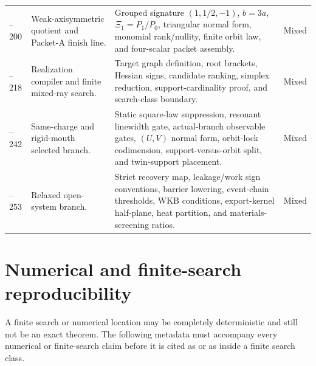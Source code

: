 \begin{longtable}{@{}L{0.13\textwidth}L{0.27\textwidth}L{0.42\textwidth}L{0.10\textwidth}@{}}
--200 & Weak-axisymmetric quotient and Packet-A finish line. & Grouped signature \((1,1/2,-1)\), \(b=3a\), \(\Xi_1=P_1/P_0\), triangular normal form, monomial rank/nullity, finite orbit law, and four-scalar packet assembly. & Mixed \\
--218 & Realization compiler and finite mixed-ray search. & Target graph definition, root brackets, Hessian signs, candidate ranking, simplex reduction, support-cardinality proof, and search-class boundary. & Mixed \\
--242 & Same-charge and rigid-mouth selected branch. & Static square-law suppression, resonant linewidth gate, actual-branch observable gates, \((U,V)\) normal form, orbit-lock codimension, support-versus-orbit split, and twin-support placement. & Mixed \\
--253 & Relaxed open-system branch. & Strict recovery map, leakage/work sign conventions, barrier lowering, event-chain thresholds, WKB conditions, export-kernel half-plane, heat partition, and materials-screening ratios. & Mixed \\
\bottomrule
\end{longtable}

\section{Numerical and finite-search reproducibility}
\label{sec:numerical-finite-search-reproducibility}

A finite search or numerical location may be completely deterministic and still not be an exact theorem.  The following metadata must accompany every numerical or finite-search claim before it is cited as \StatusNumerical{} or as \StatusExactClosure{} inside a finite search class.

